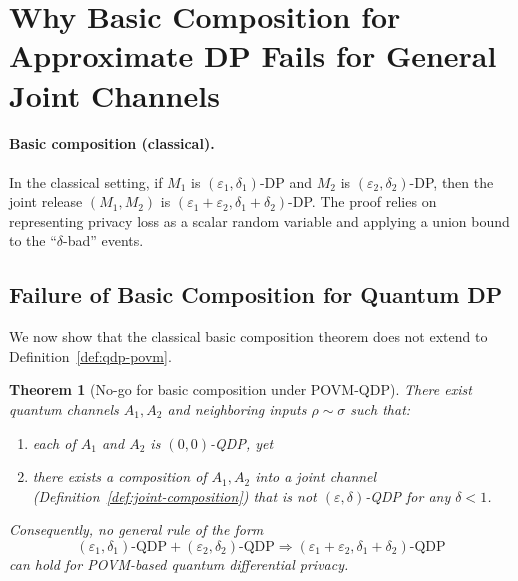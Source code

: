 \documentclass[11pt]{article}
\theoremstyle{plain}
\newtheorem{theorem}[theo]{Theorem}
\theoremstyle{remark}
\begin{document}
\section{Why Basic Composition for Approximate DP Fails for General Joint Channels}
\label{sec:no-basic-comp-qdp}


\paragraph{Basic composition (classical).}
In the classical setting, if $M_1$ is $(\varepsilon_1,\delta_1)$-DP and $M_2$ is
$(\varepsilon_2,\delta_2)$-DP, then the joint release $(M_1,M_2)$ is
$(\varepsilon_1+\varepsilon_2,\delta_1+\delta_2)$-DP. The proof relies on representing
privacy loss as a scalar random variable and applying a union bound to the ``$\delta$-bad'' events.

\subsection{Failure of Basic Composition for Quantum DP}

We now show that the classical basic composition theorem does not extend to
Definition~\ref{def:qdp-povm}.

\begin{theorem}[No-go for basic composition under POVM-QDP]
\label{thm:no-go-basic-comp}
There exist quantum channels $A_1,A_2$ and neighboring inputs $\rho\sim\sigma$ such that:
\begin{enumerate}
  \item each of $A_1$ and $A_2$ is $(0,0)$-QDP, yet
  \item there exists a composition of $A_1, A_2$ into a joint channel (Definition~\ref{def:joint-composition}) that is not $(\varepsilon,\delta)$-QDP for any $\delta<1$.
\end{enumerate}
Consequently, no general rule of the form
\[
(\varepsilon_1,\delta_1)\text{-QDP} + (\varepsilon_2,\delta_2)\text{-QDP}
\Longrightarrow (\varepsilon_1+\varepsilon_2,\delta_1+\delta_2)\text{-QDP}
\]
can hold for POVM-based quantum differential privacy.
\end{theorem}
\end{document}
